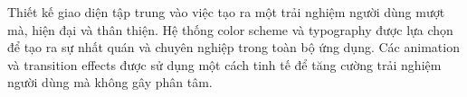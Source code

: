 Thiết kế giao diện tập trung vào việc tạo ra một trải nghiệm người dùng mượt mà, hiện đại và thân thiện. Hệ thống color scheme và typography được lựa chọn để tạo ra sự nhất quán và chuyên nghiệp trong toàn bộ ứng dụng. Các animation và transition effects được sử dụng một cách tinh tế để tăng cường trải nghiệm người dùng mà không gây phân tâm. 